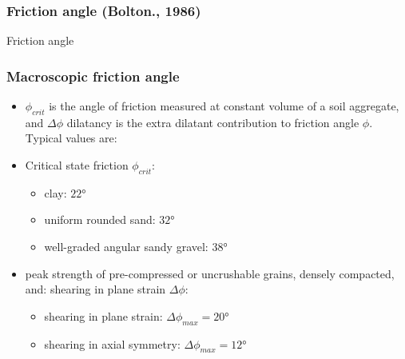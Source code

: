 \documentclass[notes]{beamer}
\begin{document}
\begin{frame}
\frametitle{Friction angle (Bolton., 1986)}
Friction angle
\end{frame}

\begin{frame}
\frametitle{Macroscopic friction angle}
\begin{itemize}
	\item $\phi_{crit}$ is the angle of friction measured at constant volume of a soil
	aggregate, and $\Delta \phi$ dilatancy is the extra dilatant contribution to
	friction angle $\phi$. Typical values are:
	\item Critical state friction $\phi_{crit}$:
	\begin{itemize}
		\item clay: $\ang{22}$
		\item uniform rounded sand: $\ang{32}$
		\item well-graded angular sandy gravel: $\ang{38}$
	\end{itemize}
	\item peak strength of pre-compressed or uncrushable grains, densely compacted, and:
	shearing in plane strain $\Delta \phi$:
	\begin{itemize}
		\item shearing in plane strain: $\Delta \phi_{max} = \ang{20}$
		\item shearing in axial symmetry: $\Delta \phi_{max} = \ang{12}$
	\end{itemize}
\end{itemize}
\end{frame}
\end{document}

